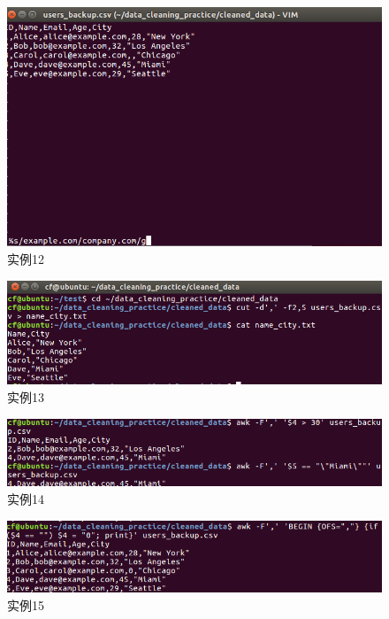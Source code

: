 \documentclass[cn,12pt]{report}
\begin{document}
      \begin{figure}[htbp]
    \centering
    \includegraphics[width=1\textwidth]{image/12.png}
    \caption{实例12}
  \end{figure}

      \begin{figure}[htbp]
    \centering
    \includegraphics[width=1\textwidth]{image/13.png}
    \caption{实例13}
  \end{figure}

    \begin{figure}[htbp]
    \centering
    \includegraphics[width=1\textwidth]{image/14.png}
    \caption{实例14}
  \end{figure}

      \begin{figure}[htbp]
    \centering
    \includegraphics[width=1\textwidth]{image/15.png}
    \caption{实例15}
  \end{figure}
\end{document}
